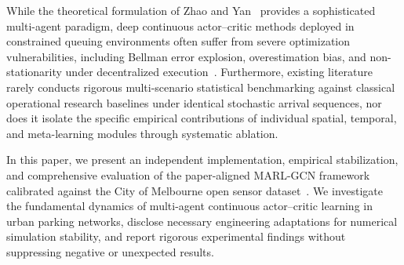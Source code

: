 \documentclass[journal]{IEEEtran}
\begin{document}
While the theoretical formulation of Zhao and Yan~\cite{zhao2025deep} provides a sophisticated multi-agent paradigm, deep continuous actor--critic methods deployed in constrained queuing environments often suffer from severe optimization vulnerabilities, including Bellman error explosion, overestimation bias, and non-stationarity under decentralized execution~\cite{fujimoto2018addressing,lillicrap2016continuous,henderson2018deep,agarwal2021deep}. Furthermore, existing literature rarely conducts rigorous multi-scenario statistical benchmarking against classical operational research baselines under identical stochastic arrival sequences, nor does it isolate the specific empirical contributions of individual spatial, temporal, and meta-learning modules through systematic ablation.

In this paper, we present an independent implementation, empirical stabilization, and comprehensive evaluation of the paper-aligned MARL-GCN framework calibrated against the City of Melbourne open sensor dataset~\cite{melbourne2024sensors}. We investigate the fundamental dynamics of multi-agent continuous actor--critic learning in urban parking networks, disclose necessary engineering adaptations for numerical simulation stability, and report rigorous experimental findings without suppressing negative or unexpected results.
\end{document}
